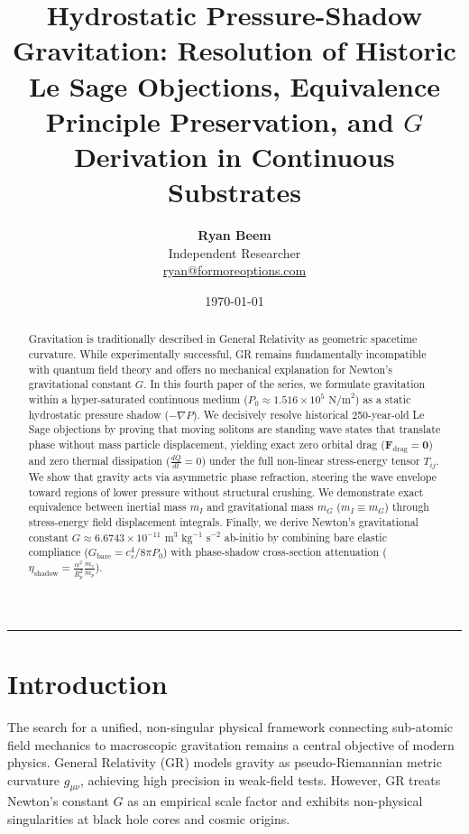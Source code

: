 \documentclass[11pt,a4paper]{article}
\title{\Large\bfseries Hydrostatic Pressure-Shadow Gravitation: Resolution of Historic Le Sage Objections, Equivalence Principle Preservation, and $G$ Derivation in Continuous Substrates}
\author{
	\textbf{Ryan Beem}\\[0.5em]
	\small Independent Researcher \\
	\small \href{mailto:ryan@formoreoptions.com}{ryan@formoreoptions.com}
}
\date{\today}
\begin{document}
	
	\maketitle
	
	\begin{abstract}
		Gravitation is traditionally described in General Relativity as geometric spacetime curvature. While experimentally successful, GR remains fundamentally incompatible with quantum field theory and offers no mechanical explanation for Newton's gravitational constant $G$. In this fourth paper of the series, we formulate gravitation within a hyper-saturated continuous medium ($P_0 \approx 1.516 \times 10^5 \text{ N/m}^2$) as a static hydrostatic pressure shadow ($-\nabla P$). We decisively resolve historical 250-year-old Le Sage objections by proving that moving solitons are standing wave states that translate phase without mass particle displacement, yielding exact zero orbital drag ($\mathbf{F}_{\text{drag}} = \mathbf{0}$) and zero thermal dissipation ($\frac{dQ}{dt} = 0$) under the full non-linear stress-energy tensor $T_{ij}$. We show that gravity acts via asymmetric phase refraction, steering the wave envelope toward regions of lower pressure without structural crushing. We demonstrate exact equivalence between inertial mass $m_I$ and gravitational mass $m_G$ ($m_I \equiv m_G$) through stress-energy field displacement integrals. Finally, we derive Newton's gravitational constant $G \approx 6.6743 \times 10^{-11} \text{ m}^3\text{ kg}^{-1}\text{ s}^{-2}$ ab-initio by combining bare elastic compliance ($G_{\text{bare}} = c_s^4 / 8\pi P_0$) with phase-shadow cross-section attenuation ($\eta_{\text{shadow}} = \frac{\alpha^2}{R_p^2} \frac{m_e}{m_p}$).
	\end{abstract}
	
	\vspace{1em}
	\hrule
	\vspace{1.5em}
	
	\section{Introduction}
	\label{sec:intro}
	
	The search for a unified, non-singular physical framework connecting sub-atomic field mechanics to macroscopic gravitation remains a central objective of modern physics. General Relativity (GR) models gravity as pseudo-Riemannian metric curvature $g_{\mu\nu}$, achieving high precision in weak-field tests. However, GR treats Newton's constant $G$ as an empirical scale factor and exhibits non-physical singularities at black hole cores and cosmic origins.
	
\end{document}
